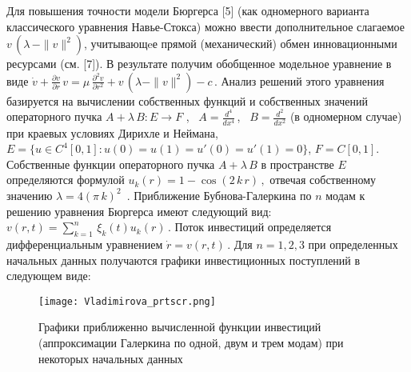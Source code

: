 Для повышения точности модели Бюргерса [5] (как одномерного варианта
классического уравнения Навье-Сток\-са) можно ввести дополнительное
слагаемое $v\,\left(\lambda\, - \|v\|^2\right)$, учитывающeе прямой
(механический) обмен инновационными ресурсами (см. [7]). В
результате получим обобщенное модельное уравнение в виде
 $
\dot{v} + \frac{\partial v}{\partial r}\,v = \mu \, \frac{\partial^2
v}{\partial r^2} + v\,\left(\lambda - \|v\|^2\right) - c \,.
 $
Анализ решений этого уравнения  базируется на вычислении собственных
функций и собственных значений операторного пучка  $A + \lambda\,B :
E \to F$ , \ $A = \frac{d^4}{dx^4}$\,, \ $B = \frac{d^2}{dx^2}$ (в
одномерном случае) при краевых условиях Дирихле и Неймана,\  $E = \{u
\in C^4 [0,1]: u(0)=u(1)=u'(0)=u'(1) = 0 \}$, $ F = C[0,1]$.
Собственные функции операторного пучка $A +\lambda\,B$ в
пространстве $E$ определяются формулой
 $
u_k(r)=1-\cos(2\,k\,r)\,,
 $
отвечая собственному значению $\lambda=4(\pi\,k)^2\,$ . Приближение
Бубнова-Галеркина по $n$ модам к решению уравнения Бюргерса имеют
следующий вид:
 $
v(r,t) = \sum\limits_{k=1}^n\,\xi_k(t)u_k(r)\,.
 $
Поток инвестиций определяется дифференциальным уравнением
 $
\dot r=v(r,t)\,.
 $
Для $n=1,2,3$ при определенных начальных данных получаются графики
инвестиционных поступлений в следующем виде:

\begin{figure}[h!t]
	\centering
	\texttt{[image: Vladimirova\_prtscr.png]}
	\caption{
		Графики приближенно вычисленной функции
		инвестиций (аппроксимации Галеркина по одной, двум и трем модам) при
		некоторых начальных данных
	}
\end{figure}



